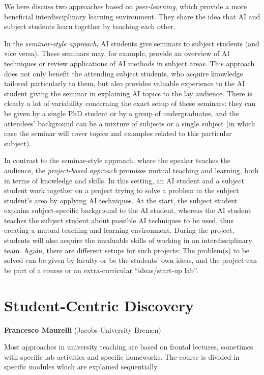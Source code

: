 \documentclass[letterpaper]{article}
\begin{document}
We here discuss two approaches based on \emph{peer-learning}, which provide a more beneficial interdisciplinary learning environment. They share the idea that AI and subject students learn together by teaching each other. 

In the \emph{seminar-style approach}, AI students give seminars to subject students (and vice versa). These seminars may, for example, provide an overview of AI techniques or review applications of AI methods in subject areas. This approach does not only benefit the attending subject students, who acquire knowledge tailored particularly to them, but also provides valuable experience to the AI student giving the seminar in explaining AI topics to the lay audience. There is clearly a lot of variability concerning the exact setup of these seminars: they can be given by a single PhD student or by a group of undergraduates, and the attendees' background can be a mixture of subjects or a single subject (in which case the seminar will cover topics and examples related to this particular subject).

In contrast to the seminar-style approach, where the speaker teaches the audience, the \emph{project-based approach} promises mutual teaching and learning, both in terms of knowledge and skills. In this setting, an AI student and a subject student work together on a project trying to solve a problem in the subject student's area by applying AI techniques. At the start, the subject student explains subject-specific background to the AI student, whereas the AI student teaches the subject student about possible AI techniques to be used, thus creating a mutual teaching and learning environment. During the project, students will also acquire the invaluable skills of working in an interdisciplinary team. Again, there are different setups for such projects: The problem(s) to be solved can be given by faculty or be the students' own ideas, and the project can be part of a course or an extra-curricular ``ideas/start-up lab''.



\section{Student-Centric Discovery}
\begin{center}
{\bf Francesco Maurelli} (Jacobs University Bremen)
\end{center}

Most approaches in university teaching are based on frontal lectures, sometimes with specific lab activities and specific homeworks. The course is divided in specific modules which are explained sequentially. 
\end{document}
